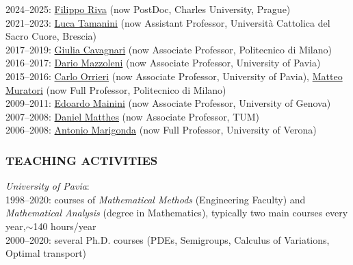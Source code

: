 \documentclass[reqno,11pt]{article}
\let\mysec\subsubsection
\newcommand{\pind}{\hangindent \parindent
  \indent}
\newcommand{\npind}{\hangindent\parindent
  \noindent}
\let\mysec\subsubsection
\theoremstyle{plain}
\begin{document}
2024--2025: \href{https://sites.google.com/view/filipporiva/home/}{Filippo Riva}
(now PostDoc, Charles University, Prague)\\
2021--2023:
\href{https://sites.google.com/view/lucatamanini}{Luca
Tamanini}
(now Assistant Professor, Universit\`a Cattolica del Sacro Cuore, Brescia)\\
2017--2019:
\href{https://sites.google.com/view/giulia-cavagnari}{Giulia
Cavagnari}
(now Associate Professor, Politecnico di Milano)\\
2016--2017:
\href{https://dariomazzoleni.weebly.com}{Dario
Mazzoleni}
(now Associate Professor, University of Pavia)\\
2015--2016:
\href{https://mate.unipv.it/orrieri/}{Carlo
Orrieri}
(now Associate Professor, University of Pavia),
\href{https://www4.ceda.polimi.it/manifesti/manifesti/controller/ricerche/RicercaPerDocentiPublic.do?evn_prodotti=EVENTO&k_doc=265344&aa=2021&lang=IT}{Matteo
Muratori}
(now Full Professor, Politecnico di Milano)\\
2009--2011:
\href{http://test.dime.unige.it/it/users/edoardo-mainini}{Edoardo
Mainini}
(now Associate Professor, University of Genova)\\
2007--2008:
\href{https://www.professoren.tum.de/matthes-daniel}{Daniel
Matthes}
(now Associate Professor, TUM)\\
2006--2008:
\href{https://www.di.univr.it/?ent=persona&id=6498&lang=en}{Antonio
Marigonda}
(now Full Professor, University of Verona)\\









\mysec*{TEACHING ACTIVITIES}
\pind
\emph{University of Pavia}:\\
1998--2020: courses of \emph{Mathematical Methods}
(Engineering Faculty) and \emph{Mathematical
  Analysis} (degree in Mathematics), typically two main courses
every year,$\sim$140 hours/year\\
2000--2020:
several Ph.D. courses (PDEs, Semigroups, Calculus of Variations, Optimal transport)
\end{document}
